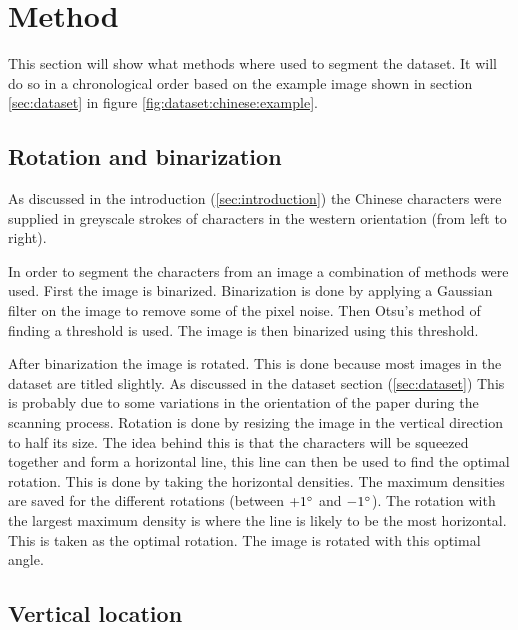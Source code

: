 \section{Method} %
\label{sec:method}

This section will show what methods where used to segment the dataset. It will do so in a chronological order based on the example image shown in section \ref{sec:dataset} in figure \ref{fig:dataset:chinese:example}.

\subsection{Rotation and binarization}


As discussed in the introduction (\ref{sec:introduction}) the Chinese characters were supplied in greyscale strokes of characters in the western orientation (from left to right).

In order to segment the characters from an image a combination of methods were used. First the image is binarized. Binarization is done by applying a Gaussian filter on the image to remove some of the pixel noise. Then Otsu's \cite{otsu}  method of finding a threshold is used. The image is then binarized using this threshold.

After binarization the image is rotated. This is done because most images in the dataset are titled slightly. As discussed in the dataset section (\ref{sec:dataset}) This is probably due to some variations in the orientation of the paper during the scanning process. Rotation is done by resizing the image in the vertical direction to half its size. The idea behind this is that the characters will be squeezed together and form a horizontal line, this line can then be used to find the optimal rotation. This is done by taking the horizontal densities. The maximum densities are saved for the different rotations (between $+1\degree$ and $-1\degree$). The rotation with the largest maximum density is where the line is likely to be the most horizontal. This is taken as the optimal rotation. The image is rotated with this optimal angle.

\subsection{Vertical location}

